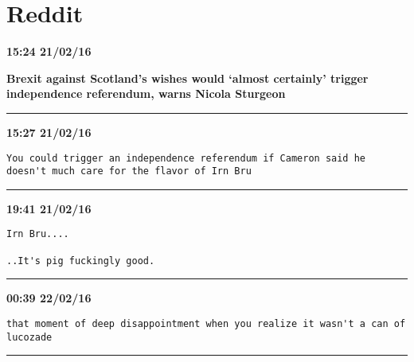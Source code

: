 \section{Reddit}
\label{threads:reddit}

\begin{adjustwidth}{0cm}{0cm}
\footnotesize \textbf{15:24 21/02/16}

\large \textbf{Brexit against Scotland's wishes would `almost certainly' trigger independence referendum, warns Nicola Sturgeon}
\end{adjustwidth}

\hrule%

\begin{adjustwidth}{0cm}{0cm}
\footnotesize \textbf{15:27 21/02/16}

\begin{lstlisting}[breaklines, breakatwhitespace, basicstyle=\small, frame=leftline]
You could trigger an independence referendum if Cameron said he doesn't much care for the flavor of Irn Bru 
\end{lstlisting}
\end{adjustwidth}

\hrule%

\begin{adjustwidth}{2cm}{0cm}
\footnotesize \textbf{19:41 21/02/16}

\begin{lstlisting}[breaklines, breakatwhitespace, basicstyle=\small, frame=leftline]
Irn Bru....

..It's pig fuckingly good.
\end{lstlisting}
\end{adjustwidth}

\hrule%

\begin{adjustwidth}{2cm}{0cm}
\footnotesize \textbf{00:39 22/02/16}

\begin{lstlisting}[breaklines, breakatwhitespace, basicstyle=\small, frame=leftline]
that moment of deep disappointment when you realize it wasn't a can of lucozade 
\end{lstlisting}
\end{adjustwidth}

\hrule%

